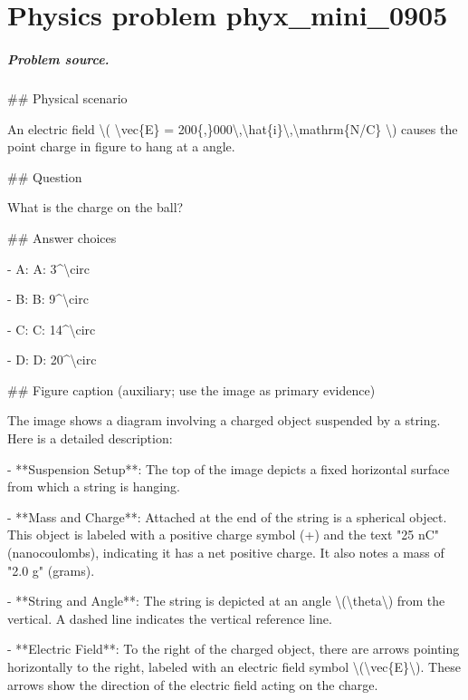 
\chapter{Physics problem phyx\_mini\_0905}
\label{ch:PhyXMiniProblems_problem_phyx_mini_0905}

\paragraph{Problem source.}
\#\# Physical scenario

An electric field \textbackslash{}( \textbackslash{}vec\{E\} = 200\{,\}000\textbackslash{},\textbackslash{}hat\{i\}\textbackslash{},\textbackslash{}mathrm\{N/C\} \textbackslash{}) causes the point charge in figure to hang at a angle.

\#\# Question

What is the charge on the ball?

\#\# Answer choices

- A: A: 3\textasciicircum{}\textbackslash{}circ

- B: B: 9\textasciicircum{}\textbackslash{}circ

- C: C: 14\textasciicircum{}\textbackslash{}circ

- D: D: 20\textasciicircum{}\textbackslash{}circ

\#\# Figure caption (auxiliary; use the image as primary evidence)

The image shows a diagram involving a charged object suspended by a string. Here is a detailed description:

- **Suspension Setup**: The top of the image depicts a fixed horizontal surface from which a string is hanging.
  
- **Mass and Charge**: Attached at the end of the string is a spherical object. This object is labeled with a positive charge symbol (+) and the text "25 nC" (nanocoulombs), indicating it has a net positive charge. It also notes a mass of "2.0 g" (grams).

- **String and Angle**: The string is depicted at an angle \textbackslash{}(\textbackslash{}theta\textbackslash{}) from the vertical. A dashed line indicates the vertical reference line.

- **Electric Field**: To the right of the charged object, there are arrows pointing horizontally to the right, labeled with an electric field symbol \textbackslash{}(\textbackslash{}vec\{E\}\textbackslash{}). These arrows show the direction of the electric field acting on the charge.

